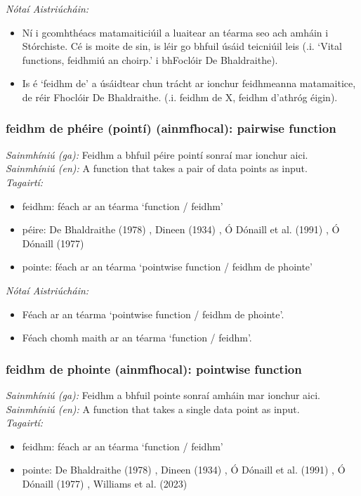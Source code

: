 \documentclass{article}
\begin{document}
 \noindent \textit{Nótaí Aistriúcháin:}
\begin{itemize}
	\item Ní i gcomhthéacs matamaiticiúil a luaitear an téarma seo ach amháin i Stórchiste. Cé is moite de sin, is léir go bhfuil úsáid teicniúil leis (.i. `Vital functions, feidhmiú an choirp.' i bhFoclóir De Bhaldraithe).
	\item Is é `feidhm de' a úsáidtear chun trácht ar ionchur feidhmeanna matamaitice, de réir Fhoclóir De Bhaldraithe. (.i. feidhm de X, feidhm d'athróg éigin).
\end{itemize}


\subsubsection*{feidhm de phéire (pointí) (ainmfhocal): pairwise function}
 \noindent \textit{Sainmhíniú (ga):} Feidhm a bhfuil péire pointí sonraí mar ionchur aici.
\\
 \noindent \textit{Sainmhíniú (en):} A function that takes a pair of data points as input.
\\
 \noindent \textit{Tagairtí:}
\begin{itemize}
	\item feidhm: féach ar an téarma `function / feidhm'
	\item péire: De Bhaldraithe (1978) \cite{de-bhaldraithe}, Dineen (1934) \cite{dineen}, Ó Dónaill et al. (1991) \cite{focloir-beag}, Ó Dónaill (1977) \cite{odonaill}
	\item pointe: féach ar an téarma `pointwise function / feidhm de phointe'
\end{itemize}

 \noindent \textit{Nótaí Aistriúcháin:}
\begin{itemize}
	\item Féach ar an téarma `pointwise function / feidhm de phointe'.
	\item Féach chomh maith ar an téarma `function / feidhm'.
\end{itemize}


\subsubsection*{feidhm de phointe (ainmfhocal): pointwise function}
 \noindent \textit{Sainmhíniú (ga):} Feidhm a bhfuil pointe sonraí amháin mar ionchur aici.
\\
 \noindent \textit{Sainmhíniú (en):} A function that takes a single data point as input.
\\
 \noindent \textit{Tagairtí:}
\begin{itemize}
	\item feidhm: féach ar an téarma `function / feidhm'
	\item pointe: De Bhaldraithe (1978) \cite{de-bhaldraithe}, Dineen (1934) \cite{dineen}, Ó Dónaill et al. (1991) \cite{focloir-beag}, Ó Dónaill (1977) \cite{odonaill}, Williams et al. (2023) \cite{storchiste}
\end{itemize}
\end{document}
